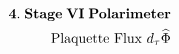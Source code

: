 \documentclass[preview]{standalone}
\begin{document}
\begin{align*}
\special{dvisvgm:raw <g id='unique000'>}\mathbf{4.\;Stage\;VI\;Polarimeter}\\\text{Plaquette Flux }d_\tau\widehat{\Phi}\special{dvisvgm:raw </g>}
\end{align*}
\end{document}
